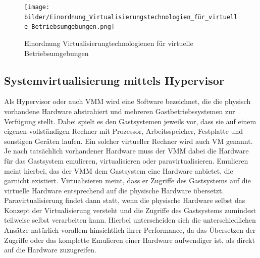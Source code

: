 \begin{figure}[!ht]
  \begin{center}
    \texttt{[image: bilder/Einordnung\_Virtualisierungstechnologien\_für\_virtuelle\_Betriebsumgebungen.png]}
    \caption{Einordnung Virtualisierungtechnologienen für virtuelle Betriebsumgebungen \citep{Hirschbach06}}
  \end{center}
\end{figure}

\subsection{Systemvirtualisierung mittels Hypervisor}

Als Hypervisor oder auch \ac{VMM} wird eine Software bezeichnet, die die physisch vorhandene Hardware abstrahiert und mehreren Gastbetriebssystemen zur Verfügung stellt. Dabei spielt es den Gastsystemen jeweils vor, dass sie auf einem eigenen vollständigen Rechner mit Prozessor, Arbeitsspeicher, Festplatte und sonstigen Geräten laufen. Ein solcher virtueller Rechner wird auch \ac{VM} genannt. Je nach tatsächlich vorhandener Hardware muss der \ac{VMM} dabei die Hardware für das Gastsystem emulieren, virtualisieren oder paravirtualisieren. Emulieren meint hierbei, das der \ac{VMM} dem Gastsystem eine Hardware anbietet, die garnicht existiert. Virtualisieren meint, dass er Zugriffe des Gastsystems auf die virtuelle Hardware entsprechend auf die physische Hardware übersetzt. Paravirtualisierung findet dann statt, wenn die physische Hardware selbst das Konzept der Virtualisierung versteht und die Zugriffe des Gastsystems zumindest teilweise selbst verarbeiten kann. Hierbei unterscheiden sich die unterschiedlichen Ansätze natürlich vorallem hinsichtlich ihrer Performance, da das Übersetzen der Zugriffe oder das komplette Emulieren einer Hardware aufwendiger ist, als direkt auf die Hardware zuzugreifen.

